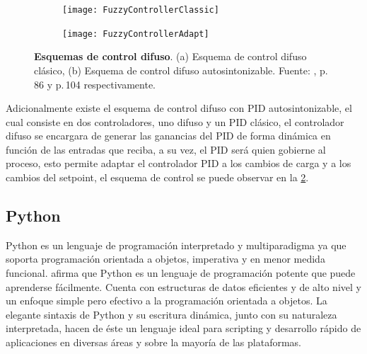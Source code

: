             \begin{figure}[htb]
                \centering
                \begin{subfigure}[t]{0.8\textwidth}
                    \centering
                    \texttt{[image: FuzzyControllerClassic]}
                    \caption{} 
                    \label{fig:fuzzycontrollerclassic}
                \end{subfigure}
                \hfill
                \begin{subfigure}[t]{0.8\textwidth}
                    \centering
                    \texttt{[image: FuzzyControllerAdapt]}
                    \caption{}
                    \label{fig:fuzzycontrolleradapt}
                \end{subfigure}
                
                \caption[Esquemas de control difuso]{\textbf{Esquemas de control difuso}. (a) Esquema de control difuso clásico, (b) Esquema de control difuso autosintonizable. Fuente: \textcite{cruz2010inteligencia}, p.$\,$86 y p.$\,$104 respectivamente. \label{fig:FuzzySchems}}
            \end{figure}
            
            Adicionalmente existe el esquema de control difuso con PID autosintonizable, el cual consiste en dos controladores, uno difuso y un PID clásico, el controlador difuso se encargara de generar las ganancias del PID de forma dinámica en función de las entradas que reciba, a su vez, el PID será quien gobierne al proceso, esto permite adaptar el controlador PID a los cambios de carga y a los cambios del setpoint, el esquema de control se puede observar en la \cref{fig:fuzzycontrolleradapt}.

            
        
    \subsection{Python}
        
        Python es un lenguaje de programación interpretado y multiparadigma ya que soporta programación orientada a objetos, imperativa y en menor medida funcional. \textcite{guido2017tutorial} afirma que Python es un lenguaje de programación potente que puede aprenderse fácilmente. Cuenta con estructuras de datos eficientes y de alto
        nivel y un enfoque simple pero efectivo a la programación orientada a objetos. La elegante sintaxis de Python y su escritura
        dinámica, junto con su naturaleza interpretada, hacen de éste un lenguaje ideal para scripting y desarrollo rápido de
        aplicaciones en diversas áreas y sobre la mayoría de las plataformas.
        
